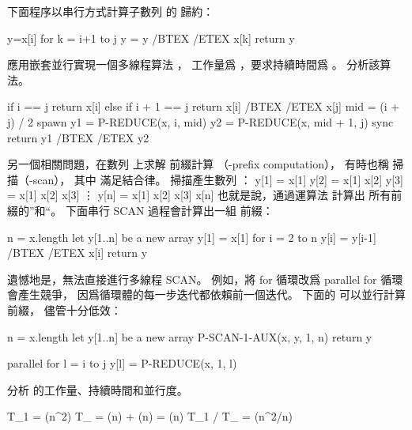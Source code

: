 下面程序以串行方式計算子數列  的 \m{\otimes} 歸約：

\startCLRS
y=x[i]
for k = i+1 to j
	y = y /BTEX \m{\otimes}/ETEX x[k]
return y
\stopCLRS

\startigBase[a]\startitem
應用嵌套並行實現一個多線程算法 ，
工作量爲 ，要求持續時間爲 。
分析該算法。
\stopitem\stopigBase

\startANSWER
{}
\startCLRS
if i == j
	return x[i]
else if i + 1 == j
	return x[i] /BTEX \m{\otimes}/ETEX x[j]
mid = (i + j) / 2
spawn y1 = P-REDUCE(x, i, mid)
y2 = P-REDUCE(x, mid + 1, j)
sync
return y1 /BTEX \m{\otimes}/ETEX y2
\stopCLRS
\stopANSWER

另一個相關問題，在數列  上求解 \m{\otimes} {\EMP 前綴計算}
（\m{\otimes}-prefix computation），
有時也稱 \m{\otimes} {\EMP 掃描}（\m{\otimes}-scan），
其中 \m{\otimes} 滿足結合律。
 \m{\otimes} 掃描產生數列 ：
\startformula\startmathalignment
\NC y[1] \NC = x[1] \NR
\NC y[2] \NC = x[1] \otimes x[2] \NR
\NC y[3] \NC = x[1] \otimes x[2] \otimes x[3] \NR
\NC      \NC \vdots \NR
\NC y[n] \NC = x[1] \otimes x[2] \otimes x[3] \otimes \cdots \otimes x[n] \NR
\stopmathalignment\stopformula
也就是說，通過運算法 \m{\otimes} 計算出  所有前綴的”和“。
下面串行 SCAN 過程會計算出一組 \m{\otimes} 前綴：

\startCLRS
n = x.length
let y[1..n] be a new array
y[1] = x[1]
for i = 2 to n
	y[i] = y[i-1] /BTEX \m{\otimes} /ETEX x[i]
return y
\stopCLRS

遺憾地是，無法直接進行多線程 SCAN。
例如，將 for 循環改爲 parallel for 循環會產生競爭，
因爲循環體的每一步迭代都依賴前一個迭代。
下面的  可以並行計算 \m{\otimes} 前綴，
儘管十分低效：

\startCLRS
n = x.length
let y[1..n] be a new array
P-SCAN-1-AUX(x, y, 1, n)
return y
\stopCLRS

\startCLRS
parallel for l = i to j
	y[l] = P-REDUCE(x, 1, l)
\stopCLRS

\startigBase[continue]\startitem
分析  的工作量、持續時間和並行度。
\stopitem\stopigBase

\startANSWER
\startformula\startmathalignment
\NC T_1 \NC = \Theta(n^2) \NR
\NC T_{\infty} \NC = \Theta(\lg n) + \Theta(\lg n) = \Theta(\lg n) \NR
\NC T_1 / T_{\infty} \NC = \Theta(n^2/\lg n) \NR
\stopmathalignment\stopformula
\stopANSWER

\stopPROBLEM

\stopsubject%
